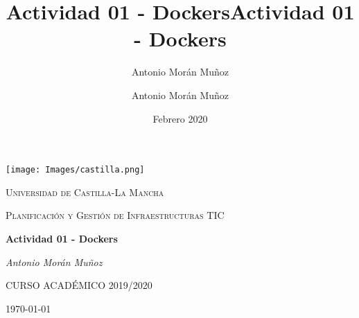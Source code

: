 \documentclass[12pt,a4paper]{article}
\title{Actividad 01 - Dockers}
\author{Antonio Morán Muñoz}
\date{Febrero 2020}
\author{Antonio Morán Muñoz}
\title{Actividad 01 - Dockers}
\begin{document}
\begin{titlepage}
\thispagestyle{empty}
\centering
	\texttt{[image: Images/castilla.png]}\par\vspace{1cm}
	{\scshape\LARGE Universidad de Castilla-La Mancha \par}
	\vspace{1cm}
	{\scshape\Large Planificación y Gestión de Infraestructuras TIC\par}
	\vspace{1.5cm}
	{\huge\bfseries Actividad 01 - Dockers\par}
	\vspace{2cm}
	{\Large\itshape Antonio Morán Muñoz\par}

	\vfill

	{CURSO ACADÉMICO 2019/2020}
	\vfill
	{\large \today\par}
\end{titlepage}
\end{document}
